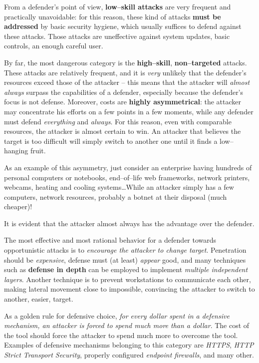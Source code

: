 \documentclass[10pt]{extbook}
\begin{document}
From a defender's point of view, \textbf{low--skill attacks} are very frequent
and practically unavoidable: for this reason, these kind of attacks
\textbf{must be addressed} by basic security hygiene, which usually suffices to
defend against these attacks. Those attacks are uneffective against system
updates, basic controls, an enough careful user.

By far, the most dangerous category is the \textbf{high--skill},
\textbf{non--targeted} attacks. These attacks are relatively frequent, and it
is \emph{very} unlikely that the defender's resources exceed those of the
attacker -- this means that the attacker will \emph{almost always} surpass the
capabilities of a defender, especially because the defender's focus is not
defense. Moreover, costs are \textbf{highly asymmetrical}: the attacker
may concentrate his efforts on a few points in a few moments, while any
defender must defend \emph{everything} and \emph{always}. For this reason, even
with comparable resources, the attacker is almost certain to win. An attacker
that believes the target is too difficult will simply switch to another one
until it finds a low--hanging fruit.

As an example of this asymmetry, just consider an enterprise having hundreds of
personal computers or notebooks, end--of--life web frameworks, network
printers, webcams, heating and cooling systems\dots While an attacker simply
has a few computers, network resources, probably a botnet at their disposal
(much cheaper)!

It is evident that the attacker almost always has the advantage over the
defender.

The most effective and most rational behavior for a defender towards
opportunistic attacks is to \emph{encourage the attacker to change target}.
Penetration should be \emph{expensive}, defense must (at least) \emph{appear}
good, and many techniques such as \textbf{defense in depth} can be employed to
implement \emph{multiple independent layers}. Another technique is to prevent
workstations to communicate each other, making lateral movement close to
impossible, convincing the attacker to switch to another, easier, target.

As a golden rule for defensive choice, \emph{for every dollar spent in a
defensive mechanism, an attacker is forced to spend much more than a dollar}.
The cost of the tool should force the attacker to spend much more to overcome
the tool. Examples of defensive mechanisms belonging to this category are
\emph{HTTPS}, \emph{HTTP Strict Transport Security}, properly configured
\emph{endpoint firewalls}, and many other.
\end{document}
